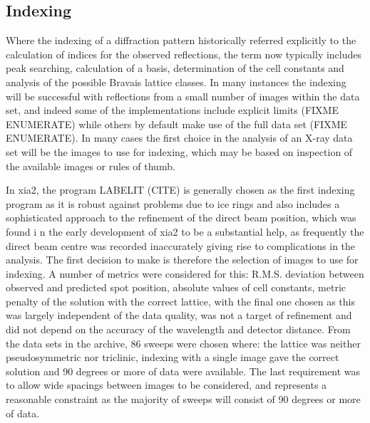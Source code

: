 \documentclass[a4paper, 11pt]{article}
\begin{document}
\subsection{Indexing}

Where the indexing of a diffraction pattern historically referred explicitly to the calculation of indices for the observed reflections, the term now typically includes peak searching, calculation of a basis, determination of the cell constants and analysis of the possible Bravais lattice classes. In many instances the indexing will be successful with reflections from a small number of images within the data set, and indeed some of the implementations include explicit limits (FIXME ENUMERATE) while others by default make use of the full data set (FIXME ENUMERATE). In many cases the first choice in the analysis of an X-ray data set will be the images to use for indexing, which may be based on inspection of the available images or rules of thumb. 

In xia2, the program LABELIT (CITE) is generally chosen as the first indexing program as it is robust against problems due to ice rings and also includes a sophisticated approach to the refinement of the direct beam position, which was found i n the early development of xia2 to be a substantial help, as frequently the direct beam centre was recorded inaccurately giving rise to complications in the analysis. The first decision to make is therefore the selection of images to use for indexing. A number of metrics were considered for this: R.M.S. deviation between observed and predicted spot position, absolute values of cell constants, metric penalty of the solution with the correct lattice, with the final one chosen as this was largely independent of the data quality, was not a target of refinement and did not depend on the accuracy of the wavelength and detector distance. From the data sets in the archive, 86 sweeps were chosen where: the lattice was neither pseudosymmetric nor triclinic, indexing with a single image gave the correct solution and 90 degrees or more of data were available. The last requirement was to allow wide spacings between images to be considered, and represents a reasonable constraint as the majority of sweeps will consist of 90 degrees or more of data. 
\end{document}
